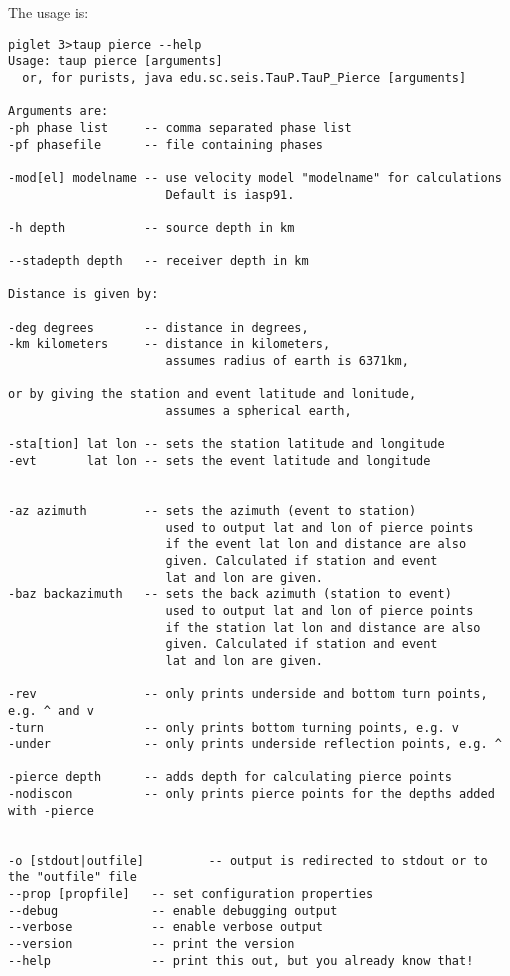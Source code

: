 The usage is:
\begin{verbatim}
piglet 3>taup pierce --help
Usage: taup pierce [arguments]
  or, for purists, java edu.sc.seis.TauP.TauP_Pierce [arguments]

Arguments are:
-ph phase list     -- comma separated phase list
-pf phasefile      -- file containing phases

-mod[el] modelname -- use velocity model "modelname" for calculations
                      Default is iasp91.

-h depth           -- source depth in km

--stadepth depth   -- receiver depth in km

Distance is given by:

-deg degrees       -- distance in degrees,
-km kilometers     -- distance in kilometers,
                      assumes radius of earth is 6371km,

or by giving the station and event latitude and lonitude,
                      assumes a spherical earth,

-sta[tion] lat lon -- sets the station latitude and longitude
-evt       lat lon -- sets the event latitude and longitude


-az azimuth        -- sets the azimuth (event to station)
                      used to output lat and lon of pierce points
                      if the event lat lon and distance are also
                      given. Calculated if station and event
                      lat and lon are given.
-baz backazimuth   -- sets the back azimuth (station to event)
                      used to output lat and lon of pierce points
                      if the station lat lon and distance are also
                      given. Calculated if station and event
                      lat and lon are given.

-rev               -- only prints underside and bottom turn points, e.g. ^ and v
-turn              -- only prints bottom turning points, e.g. v
-under             -- only prints underside reflection points, e.g. ^

-pierce depth      -- adds depth for calculating pierce points
-nodiscon          -- only prints pierce points for the depths added with -pierce


-o [stdout|outfile]         -- output is redirected to stdout or to the "outfile" file
--prop [propfile]   -- set configuration properties
--debug             -- enable debugging output
--verbose           -- enable verbose output
--version           -- print the version
--help              -- print this out, but you already know that!
\end{verbatim}


